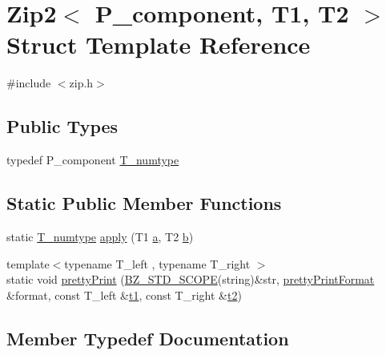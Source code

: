 \hypertarget{structZip2}{}\section{Zip2$<$ P\+\_\+component, T1, T2 $>$ Struct Template Reference}
\label{structZip2}


{\ttfamily \#include $<$zip.\+h$>$}

\subsection*{Public Types}
\begin{DoxyCompactItemize}
\item 
typedef P\+\_\+component \hyperlink{structZip2_ad8d47dcf82cbce4ff8b0c5a5bb51478f}{T\+\_\+numtype}
\end{DoxyCompactItemize}
\subsection*{Static Public Member Functions}
\begin{DoxyCompactItemize}
\item 
static \hyperlink{structZip2_ad8d47dcf82cbce4ff8b0c5a5bb51478f}{T\+\_\+numtype} \hyperlink{structZip2_aec566c8b76576aa0b30c878fccd7ff46}{apply} (T1 \hyperlink{gen__mat5files_8m_aae328bf20413f220e38aec4d95bfd6da}{a}, T2 \hyperlink{gen__mat5files_8m_a7b38767b3b6a8dae167e5afa4fc340b0}{b})
\item 
{\footnotesize template$<$typename T\+\_\+left , typename T\+\_\+right $>$ }\\static void \hyperlink{structZip2_a98ea9b52492cf46e350a97cff725decf}{pretty\+Print} (\hyperlink{numinquire_8h_a2b24ffc3b4ef9803956bc7715c6c7b83}{B\+Z\+\_\+\+S\+T\+D\+\_\+\+S\+C\+O\+P\+E}(string)\&str, \hyperlink{classprettyPrintFormat}{pretty\+Print\+Format} \&format, const T\+\_\+left \&\hyperlink{sparse_2linalg_2eigen_2arpack_2ARPACK_2SRC_2stat_8h_af377a4e2b03dbeb6590856bdfca3df30}{t1}, const T\+\_\+right \&\hyperlink{sparse_2linalg_2eigen_2arpack_2ARPACK_2SRC_2stat_8h_a856c446f66cf9106cfe195e2d8ea1c05}{t2})
\end{DoxyCompactItemize}


\subsection{Member Typedef Documentation}
\hypertarget{structZip2_ad8d47dcf82cbce4ff8b0c5a5bb51478f}{}

